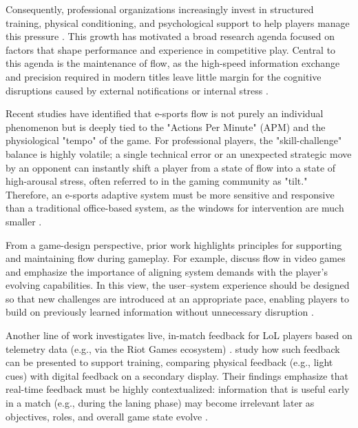 Consequently, professional organizations increasingly invest in structured training, physical conditioning, and psychological support to help players manage this pressure \autocite{poulus2021determinants}. This growth has motivated a broad research agenda focused on factors that shape performance and experience in competitive play. Central to this agenda is the maintenance of flow, as the high-speed information exchange and precision required in modern titles leave little margin for the cognitive disruptions caused by external notifications or internal stress \autocite{ubt_eref88160, cowley2008understanding}.

Recent studies have identified that e-sports flow is not purely an individual phenomenon but is deeply tied to the "Actions Per Minute" (APM) and the physiological "tempo" of the game. For professional players, the "skill-challenge" balance is highly volatile; a single technical error or an unexpected strategic move by an opponent can instantly shift a player from a state of flow into a state of high-arousal stress, often referred to in the gaming community as "tilt." Therefore, an e-sports adaptive system must be more sensitive and responsive than a traditional office-based system, as the windows for intervention are much smaller \autocite{poulus2021determinants, banyai2019psychology}.

From a game-design perspective, prior work highlights principles for supporting and maintaining flow during gameplay. For example, \textcite{cowley2008understanding} discuss flow in video games and emphasize the importance of aligning system demands with the player's evolving capabilities. In this view, the user--system experience should be designed so that new challenges are introduced at an appropriate pace, enabling players to build on previously learned information without unnecessary disruption \autocite{cowley2008understanding}.

Another line of work investigates live, in-match feedback for LoL players based on telemetry data (e.g., via the Riot Games ecosystem) \autocite{riotgames_lol}. \textcite{10.1145/3549506} study how such feedback can be presented to support training, comparing physical feedback (e.g., light cues) with digital feedback on a secondary display. Their findings emphasize that real-time feedback must be highly contextualized: information that is useful early in a match (e.g., during the laning phase) may become irrelevant later as objectives, roles, and overall game state evolve \autocite{10.1145/3549506}.

